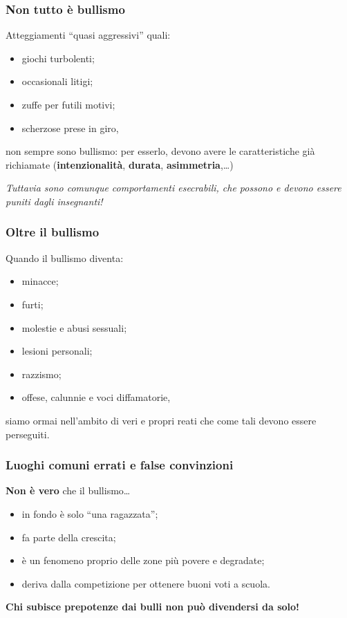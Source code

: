 \documentclass[13pt]{beamer}
\begin{document}
	\begin{frame}
		\frametitle{Non tutto è bullismo}
		Atteggiamenti ``quasi aggressivi'' quali:
		
		\begin{itemize}
			\item giochi turbolenti;
			\item occasionali litigi;
			\item zuffe per futili motivi;
			\item scherzose prese in giro,
		\end{itemize}
		\alert{non sempre sono bullismo}: per esserlo, devono avere le caratteristiche già richiamate (\textbf{intenzionalità}, \textbf{durata}, \textbf{asimmetria},\dots)
		
		\textit{Tuttavia sono comunque comportamenti esecrabili, che possono e devono essere puniti dagli insegnanti!}
	\end{frame}	

	\begin{frame}
		\frametitle{Oltre il bullismo}
		Quando il bullismo diventa:
		\begin{itemize}
			\item minacce;
			\item furti;
			\item molestie e abusi sessuali;
			\item lesioni personali;
			\item razzismo;
			\item offese, calunnie e voci diffamatorie,
		\end{itemize}
	siamo ormai nell'ambito di veri e propri \alert{reati} che come tali devono essere perseguiti.
	\end{frame}

	\begin{frame}
		\frametitle{Luoghi comuni errati e false convinzioni}
		\textbf{Non è vero} che il bullismo\dots
		\begin{itemize}
			\item in fondo è solo ``una ragazzata'';
			\item fa parte della crescita;
			\item è un fenomeno proprio delle zone più povere e degradate;
			\item deriva dalla competizione per ottenere buoni voti a scuola.
		\end{itemize}
		
		\textbf{Chi subisce prepotenze dai bulli non può divendersi da solo!}
		
	\end{frame}
\end{document}
